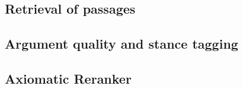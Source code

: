     \subsection{Retrieval of passages}
    \subsection{Argument quality and stance tagging}
    \subsection{Axiomatic Reranker}